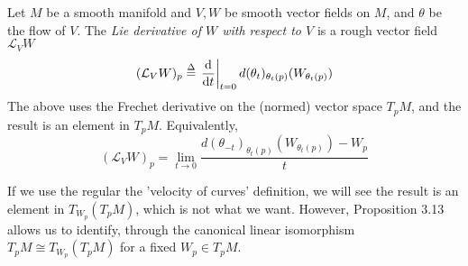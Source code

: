 \documentclass[../main-manifolds.tex]{subfiles}
\begin{document}
\providecommand{\szz}{\mathcal{S}}
\providecommand{\ccinf}{C_c^\infty}

\providecommand{\Taux}{\Tau_\xx}
\providecommand{\Tauy}{\Tau_\yy}
\providecommand{\Tauxy}{\Tau_{\xx\times\yy}}

\providecommand{\Bx}{\borel_\xx}
\providecommand{\By}{\borel_\yy}
\providecommand{\Bxy}{\borel_{\xx\times\yy}}




\begin{definition}\label{lee-chp9:lie-derivative-definition}
    Let $M$ be a smooth manifold and $V, W$ be smooth vector fields on $M$, and $\theta$ be the flow of $V$. The \emph{Lie derivative of $W$ with respect to $V$} is a rough vector field $\mathcal{L}_V W$
    \begin{equation}\label{lie-derivative-def-1-vector}
        (\mathcal{L}_V W)_p \defined \eval{\dv{t}}_{t=0} d(\theta_t)_{\theta_t(p)}(W_{\theta_t(p)})
    \end{equation}
    The above uses the Frechet derivative on the (normed) vector space $T_p M$, and the result is an element in $T_p M$. Equivalently,
    \begin{equation}\label{lie-derivative-def-2-vector}
        (\mathcal{L}_V W)_p = \lim_{t\to 0}\dfrac{d(\theta_{-t})_{\theta_t (p)}(W_{\theta_t(p)}) - W_p}{t}
    \end{equation}
\end{definition}
\begin{remark}
    If we use the regular the 'velocity of curves' definition, we will see the result is an element in $T_{W_p}(T_pM)$, which is not what we want. However, Proposition 3.13 allows us to identify, through the canonical linear isomorphism $T_pM\cong T_{W_{p}}(T_p M)$ for a fixed $W_p\in T_pM$.
\end{remark}
\end{document}
